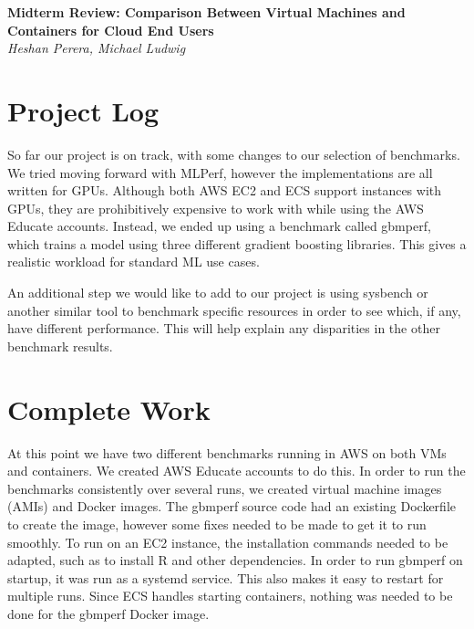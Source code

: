 \documentclass[11pt]{article}
\begin{document}
\renewcommand{\headrulewidth}{0pt} 
\renewcommand{\footrulewidth}{0pt} 
\pagestyle{fancy}
\cfoot{}
\lhead{}
\rhead{}
\lfoot{\itshape\textcolor{gray}{CS525T Cloud Computing Paper Review}}

\begin{center}
{\LARGE \bf Midterm Review: Comparison Between Virtual Machines and Containers for Cloud End Users} \\
{\normalsize \emph{Heshan Perera, Michael Ludwig}}\\

\end{center}

\section{Project Log}

So far our project is on track, with some changes to our selection of benchmarks. We tried moving forward with MLPerf, however the implementations are all written for GPUs. Although both AWS EC2 and ECS support instances with GPUs, they are prohibitively expensive to work with while using the AWS Educate accounts. Instead, we ended up using a benchmark called gbmperf, which trains a model using three different gradient boosting libraries. This gives a realistic workload for standard ML use cases.

An additional step we would like to add to our project is using sysbench or another similar tool to benchmark specific resources in order to see which, if any, have different performance. This will help explain any disparities in the other benchmark results.

\section{Complete Work}

At this point we have two different benchmarks running in AWS on both VMs and containers. We created AWS Educate accounts to do this. In order to run the benchmarks consistently over several runs, we created virtual machine images (AMIs) and Docker images. The gbmperf source code had an existing Dockerfile to create the image, however some fixes needed to be made to get it to run smoothly. To run on an EC2 instance, the installation commands needed to be adapted, such as to install R and other dependencies. In order to run gbmperf on startup, it was run as a systemd service. This also makes it easy to restart for multiple runs. Since ECS handles starting containers, nothing was needed to be done for the gbmperf Docker image.
\end{document}
